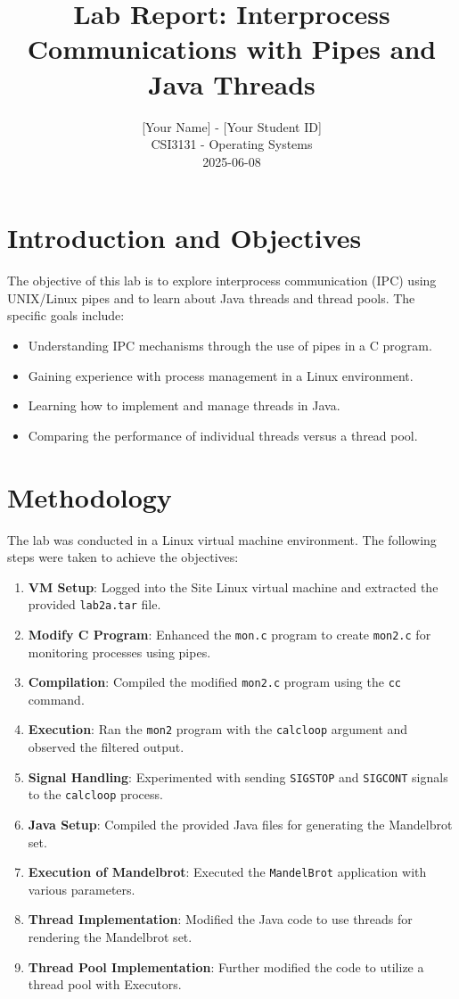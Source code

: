 \documentclass[a4paper,12pt]{article}
\title{Lab Report: Interprocess Communications with Pipes and Java Threads}
\author{[Your Name] - [Your Student ID] \\ CSI3131 - Operating Systems \\ 2025-06-08}
\date{}
\begin{document}
\maketitle

\section{Introduction and Objectives}
The objective of this lab is to explore interprocess communication (IPC) using UNIX/Linux pipes and to learn about Java threads and thread pools. The specific goals include:
\begin{itemize}
    \item Understanding IPC mechanisms through the use of pipes in a C program.
    \item Gaining experience with process management in a Linux environment.
    \item Learning how to implement and manage threads in Java.
    \item Comparing the performance of individual threads versus a thread pool.
\end{itemize}

\section{Methodology}
The lab was conducted in a Linux virtual machine environment. The following steps were taken to achieve the objectives:
\begin{enumerate}
    \item \textbf{VM Setup}: Logged into the Site Linux virtual machine and extracted the provided \texttt{lab2a.tar} file.
    \item \textbf{Modify C Program}: Enhanced the \texttt{mon.c} program to create \texttt{mon2.c} for monitoring processes using pipes.
    \item \textbf{Compilation}: Compiled the modified \texttt{mon2.c} program using the \texttt{cc} command.
    \item \textbf{Execution}: Ran the \texttt{mon2} program with the \texttt{calcloop} argument and observed the filtered output.
    \item \textbf{Signal Handling}: Experimented with sending \texttt{SIGSTOP} and \texttt{SIGCONT} signals to the \texttt{calcloop} process.
    \item \textbf{Java Setup}: Compiled the provided Java files for generating the Mandelbrot set.
    \item \textbf{Execution of Mandelbrot}: Executed the \texttt{MandelBrot} application with various parameters.
    \item \textbf{Thread Implementation}: Modified the Java code to use threads for rendering the Mandelbrot set.
    \item \textbf{Thread Pool Implementation}: Further modified the code to utilize a thread pool with Executors.
\end{enumerate}
\end{document}
